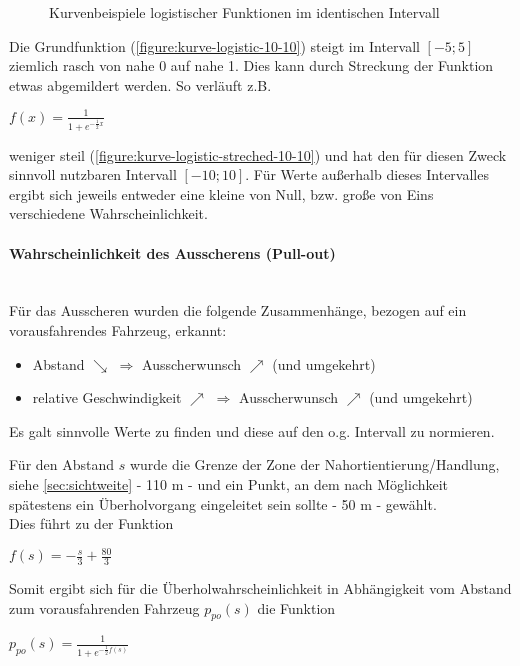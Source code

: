 \begin{figure}[hptb]
  \centering
     \qquad 
  \caption[Kurvenbeispiele der logistischen Funktion]
          {Kurvenbeispiele logistischer Funktionen im identischen Intervall}
  \label{figure:kurve-logistic}
\end{figure}

\noindent
Die Grundfunktion (\cref{figure:kurve-logistic-10-10}) steigt im Intervall $ [-5; 5] $ ziemlich rasch von nahe 0 auf nahe 1.
Dies kann durch Streckung der Funktion etwas abgemildert werden.
So verläuft z.B. 
\begin{center}
$ f(x) = \frac{1}{1 + e^{-\frac{1}{2}x}} $ 
\end{center}
weniger steil (\cref{figure:kurve-logistic-streched-10-10}) und hat den für diesen Zweck sinnvoll nutzbaren Intervall $ [-10; 10 ] $.
Für Werte außerhalb dieses Intervalles ergibt sich jeweils entweder eine kleine von Null, bzw. große von Eins verschiedene Wahrscheinlichkeit.

\paragraph*{Wahrscheinlichkeit des Ausscherens (Pull-out)} 
\hfill \\
Für das Ausscheren wurden die folgende Zusammenhänge, bezogen auf ein vorausfahrendes Fahrzeug, erkannt:
\begin{itemize}
    \itemsep0em
    \item Abstand $ \searrow $  $ \Longrightarrow $ Ausscherwunsch $ \nearrow $ (und umgekehrt)
    \item relative Geschwindigkeit $ \nearrow $ $ \Longrightarrow $ Ausscherwunsch $ \nearrow $ (und umgekehrt)
\end{itemize}

Es galt sinnvolle Werte zu finden und diese auf den o.g. Intervall zu normieren.

Für den Abstand $ s $ wurde die Grenze der Zone der Nahortientierung/Handlung, siehe \cref{sec:sichtweite} - 110 m - und ein Punkt, an dem nach Möglichkeit spätestens ein Überholvorgang eingeleitet sein sollte - 50 m - gewählt.
\\
Dies führt zu der Funktion
\begin{center}
$ f(s) = -\frac{s}{3} + \frac{80}{3} $
\end{center}
Somit ergibt sich für die Überholwahrscheinlichkeit in Abhängigkeit vom Abstand zum vorausfahrenden Fahrzeug $ p_{po}(s) $ die Funktion
\begin{center}
$ p_{po}(s) = \frac{1}{1 + e^{-\frac{1}{2}f(s)}} $
\end{center}

